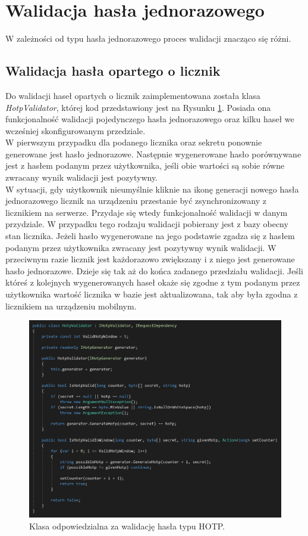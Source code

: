 \section{Walidacja hasła jednorazowego}
W zależności od typu hasła jednorazowego proces walidacji znacząco się różni.

\subsection{Walidacja hasła opartego o licznik}
Do walidacji haseł opartych o licznik zaimplementowana została klasa \textit{HotpValidator}, której kod przedstawiony jest 
na Rysunku \ref{hotp-validator}. Posiada ona funkcjonalność walidacji pojedynczego hasła jednorazowego 
oraz kilku haseł we wcześniej skonfigurowanym przedziale. \\
W pierwszym przypadku dla podanego licznika oraz sekretu ponownie generowane jest hasło jednorazowe.
Następnie wygenerowane hasło porównywane jest z hasłem podanym przez użytkownika, jeśli obie wartości są sobie równe
zwracany wynik walidacji jest pozytywny. \\
W sytuacji, gdy użytkownik nieumyślnie kliknie na ikonę generacji nowego hasła jednorazowego 
licznik na urządzeniu przestanie być zsynchronizowany z licznikiem na serwerze. 
Przydaje się wtedy funkcjonalność walidacji w danym przydziale. 
W przypadku tego rodzaju walidacji pobierany jest z bazy obecny stan licznika. 
Jeżeli hasło wygenerowane na jego podstawie zgadza się z hasłem podanym przez użytkownika zwracany jest 
pozytywny wynik walidacji. 
W przeciwnym razie licznik jest każdorazowo zwiększany i z niego jest generowane hasło jednorazowe. 
Dzieje się tak aż do końca zadanego przedziału walidacji. 
Jeśli któreś z kolejnych wygenerowanych haseł okaże się zgodne z tym podanym przez użytkownika 
wartość licznika w bazie jest aktualizowana, tak aby była zgodna z licznikiem na urządzeniu mobilnym.
\begin{figure}[t]
    \centering
	\includegraphics[width=\textwidth]{content/images/code-hvalidator}
    \caption{Klasa odpowiedzialna za walidację hasła typu HOTP.}
    \label{hotp-validator}
\end{figure} 

